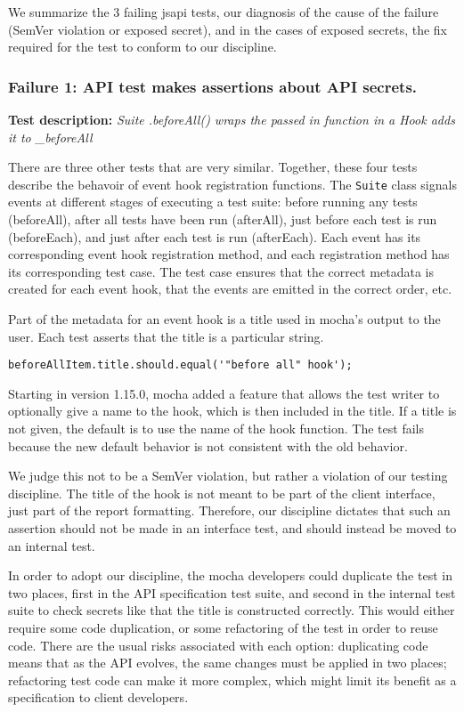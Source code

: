 We summarize the 3 failing jsapi tests, our diagnosis of the cause of
the failure (SemVer violation or exposed secret), and in the cases of
exposed secrets, the fix required for the test to conform to our
discipline.

\subsubsection{Failure 1: API test makes assertions about API secrets.}
{\bf Test description: } {\em Suite .beforeAll() wraps the passed in
function in a Hook adds it to \_beforeAll}
\label{sec:failure1}

\/There are three other tests that are very similar. Together, these
four tests describe the behavoir of event hook registration
functions. The {\tt Suite} class signals events at different stages of
executing a test suite: before running any tests (beforeAll), after
all tests have been run (afterAll), just before each test is run
(beforeEach), and just after each test is run (afterEach). Each event
has its corresponding event hook registration method, and each
registration method has its corresponding test case. The test case
ensures that the correct metadata is created for each event hook, that
the events are emitted in the correct order, etc.

Part of the metadata for an event hook is a title used in mocha's
output to the user. Each test asserts that the title is a particular
string.

{\small
\begin{verbatim}
beforeAllItem.title.should.equal('"before all" hook');
\end{verbatim}
}

Starting in version 1.15.0, mocha added a feature that allows the test
writer to optionally give a name to the hook, which is then included
in the title. If a title is not given, the default is to use the name
of the hook function. The test fails because the new default behavior
is not consistent with the old behavior.

We judge this not to be a SemVer violation, but rather a violation of
our testing discipline. The title of the hook is not meant to be part
of the client interface, just part of the report
formatting. Therefore, our discipline dictates that such an assertion
should not be made in an interface test, and should instead be moved
to an internal test.

In order to adopt our discipline, the mocha developers could duplicate
the test in two places, first in the API specification test suite, and
second in the internal test suite to check secrets like that the title
is constructed correctly. This would either require some code
duplication, or some refactoring of the test in order to reuse
code. There are the usual risks associated with each option:
duplicating code means that as the API evolves, the same changes must
be applied in two places; refactoring test code can make it more
complex, which might limit its benefit as a specification to client
developers.

